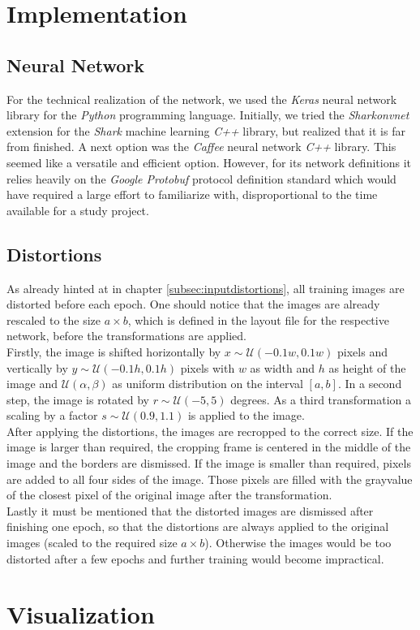 \documentclass[11pt, a4paper]{article}
\newcommand\closedInt[2]{\left[#1,#2\right]}
\begin{document}
\begin{appendix}
	\section{Implementation}
	
	\subsection{Neural Network}
	For the technical realization of the network, we used the \emph{Keras} neural network library for the \emph{Python} programming language. Initially, we tried the \emph{Sharkonvnet} extension for the \emph{Shark} machine learning \emph{C++} library, but realized that it is far from finished. A next option was the \emph{Caffee} neural network \emph{C++} library. This seemed like a versatile and efficient option. However, for its network definitions it relies heavily on the \emph{Google Protobuf} protocol definition standard which would have required a large effort to familiarize with, disproportional to the time available for a study project.
	
	\subsection{Distortions}
	\label{sec:implementation-distortions}
	As already hinted at in chapter \ref{subsec:inputdistortions}, all training images are distorted before each epoch.
	One should notice that the images are already rescaled to the size $a \times b$, which is defined in the layout file for the respective network, before the transformations are applied.\\
	Firstly, the image is shifted horizontally by $x \sim \mathcal{U}(- 0.1 w, 0.1 w)$ pixels and vertically by $y \sim \mathcal{U}(- 0.1 h, 0.1 h)$ pixels with $w$ as width and $h$ as height of the image and $\mathcal{U}(\alpha,\beta)$ as uniform distribution on the interval $\closedInt{a}{b}$. In a second step, the image is rotated by $r \sim \mathcal{U}(-5, 5)$ degrees. As a third transformation a scaling by a factor $s \sim \mathcal{U}(0.9,1.1)$ is applied to the image.\\
	After applying the distortions, the images are recropped to the correct size. If the image is larger than required, the cropping frame is centered in the middle of the image and the borders are dismissed. If the image is smaller than required, pixels are added to all four sides of the image. Those pixels are filled with the grayvalue of the closest pixel of the original image after the transformation.\\
	Lastly it must be mentioned that the distorted images are dismissed after finishing one epoch, so that the distortions are always applied to the original images (scaled to the required size $a \times b$). Otherwise the images would be too distorted after a few epochs and further training would become impractical.
	
	\section{Visualization}
\end{appendix}

{}

\end{document}
